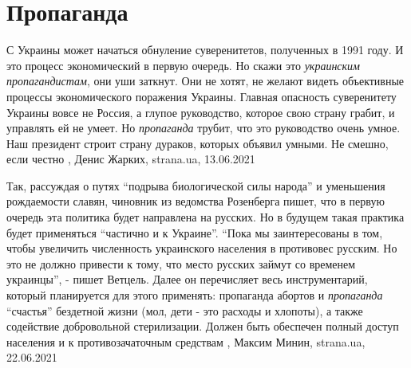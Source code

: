  
 
 
 
 
\chapter{Пропаганда}
\label{sec:slova.propaganda}

С Украины может начаться обнуление суверенитетов, полученных в 1991 году. И это
процесс экономический в первую очередь. Но скажи это \emph{украинским пропагандистам},
они уши заткнут. Они не хотят, не желают видеть объективные процессы
экономического поражения Украины. Главная опасность суверенитету Украины вовсе
не Россия, а глупое руководство, которое свою страну грабит, и управлять ей не
умеет. Но \emph{пропаганда} трубит, что это руководство очень умное. Наш президент
строит страну дураков, которых объявил умными. Не смешно, если честно
, 
Денис Жарких, strana.ua, 13.06.2021

Так, рассуждая о путях \enquote{подрыва биологической силы народа} и уменьшения
рождаемости славян, чиновник из ведомства Розенберга пишет, что в первую
очередь эта политика будет направлена на русских. Но в будущем такая практика
будет применяться \enquote{частично и к Украине}.  \enquote{Пока мы заинтересованы в том, чтобы
увеличить численность украинского населения в противовес русским. Но это не
должно привести к тому, что место русских займут со временем украинцы}, - пишет
Ветцель.  Далее он перечисляет весь инструментарий, который планируется для
этого применять: пропаганда абортов и \emph{пропаганда} \enquote{счастья} бездетной жизни
(мол, дети - это расходы и хлопоты), а также содействие добровольной
стерилизации. Должен быть обеспечен полный доступ населения и к
противозачаточным средствам
  , Максим Минин, strana.ua, 22.06.2021

